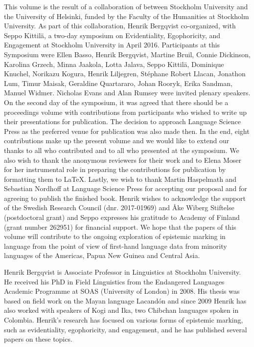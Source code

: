 \begin{refsection}

This volume is the result of a collaboration of between Stockholm University and the University of Helsinki, funded by the Faculty of the Humanities at Stockholm University. As part of this collaboration, Henrik Bergqvist co-organized, with Seppo Kittilä, a two-day symposium on Evidentiality, Egophoricity, and Engagement at Stockholm University in April 2016. Participants at this Symposium were Ellen Basso, Henrik Bergqvist, Martine Bruil, Connie Dickinson, Karolina Grzech, Minna Jaakola, Lotta Jalava, Seppo Kittilä, Dominique Knuchel, Norikazu Kogura, Henrik Liljegren, Stéphane Robert Llacan, Jonathon Lum, Timur Maisak, Geraldine Quartararo, Johan Rooryk, Erika Sandman, Manuel Widmer. Nicholas Evans and Alan Rumsey were invited plenary speakers. On the second day of the symposium, it was agreed that there should be a proceedings volume with contributions from participants who wished to write up their presentations for publication. The decision to approach Language Science Press as the preferred venue for publication was also made then. In the end, eight contributions make up the present volume and we would like to extend our thanks to all who contributed and to all who presented at the symposium. We also wish to thank the anonymous reviewers for their work and to Elena Moser for her instrumental role in preparing the contributions for publication by formatting them to \LaTeX. Lastly, we wish to thank Martin Haspelmath and Sebastian Nordhoff at Language Science Press for accepting our proposal and for agreeing to publish the finished book. Henrik wishes to acknowledge the support of the Swedish Research Council (dnr. 2017-01969) and Åke Wiberg Stiftelse (postdoctoral grant) and Seppo expresses his gratitude to Academy of Finland (grant number 262951) for financial support. We hope that the papers of this volume will contribute to the ongoing exploration of epistemic marking in language from the point of view of first-hand language data from minority languages of the Americas, Papua New Guinea and Central Asia.  


Henrik Bergqvist is Associate Professor in Linguistics at Stockholm University. He received his PhD in Field Linguistics from the Endangered Languages Academic Programme at SOAS (University of London) in 2008. His thesis was based on field work on the Mayan language Lacandón and since 2009 Henrik has also worked with speakers of Kogi and Ika, two Chibchan languages spoken in Colombia. Henrik’s research has focused on various forms of epistemic marking, such as evidentiality, egophoricity, and engagement, and he has published several papers on these topics.    


\end{refsection}
